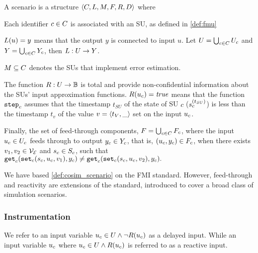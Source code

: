 \begin{definition}[Scenario]\label{def:cosim_scenario}
  A scenario is a structure $ \left\langle C, L, M, F, R, D \right\rangle $ where 
  \begin{compactitem}
    \item Each identifier $c \in C$ is associated with an SU, as defined in \cref{def:fmu}
    \item $L(u)=y$ means that the output $y$ is connected to input $u$.   
    Let $U = \bigcup_{c \in C} U_{c}$ and $Y = \bigcup_{c \in C} Y_{c}$, then $L : U \to Y$. 
    \item $M \subseteq C$ denotes the SUs that implement error estimation. 
    \item The function
    $R : U \to \mathbb{B}$ is total and provide non-confidential information about the SUs' input approximation functions.
    $R(u_{c}) = \mathit{true}$ means that the function $\mathtt{step}_{c}$ assumes that the timestamp $t_{SU}$ of the state of SU $c$ ($s_{c}^{(t_{SU})}$) is less than the timestamp $t_v$ of the value $v =  \left\langle t_V,\_ \right\rangle $ set on the input $u_{c}$.
    \item  Finally, the set of feed-through components, $F = \bigcup_{c \in C} F_{c}$, where the input $u_{c} \in U_{c}$ feeds through to output $y_{c} \in Y_{c}$, that is, $(u_{c},y_{c}) \in F_{c}$, when there exists $v_1, v_2 \in \mathcal{V_{E}}$ and $s_{c} \in S_{c}$, such that
    $\mathtt{get}_{c} (\mathtt{set}_{c}(s_{c}, u_{c}, v_1), y_{c}) \neq \mathtt{get}_{c} (\mathtt{set}_{c}(s_{c}, u_{c}, v_2), y_{c}).$
  \end{compactitem}
\end{definition}

We have based \cref{def:cosim_scenario} on the FMI standard. 
However, feed-through and reactivity are extensions of the standard, introduced to cover a broad class of simulation scenarios.

\subsubsection{Instrumentation}
We refer to an input variable $u_{c} \in U \land \neg R(u_{c})$ as a delayed input. 
While an input variable $u_{c}$ where $u_{c} \in U \land R(u_{c})$ is referred to as a reactive input. 

